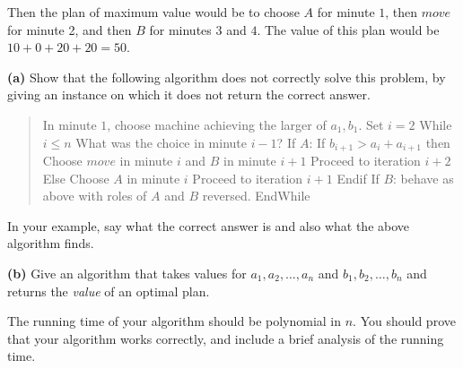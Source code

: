 \documentclass[12pt]{article}
\begin{document}
\begin{enumerate}
Then the plan of maximum value would be to choose
$A$ for minute $1$, then $move$ for minute 2,
and then $B$ for minutes $3$ and $4$.
The value of this plan would be $10 + 0 + 20 + 20 = 50$.

\bigskip
\bigskip

{\bf (a)} Show that the following algorithm does not
correctly solve this problem, by giving an instance on which
it does not return the correct answer.
\begin{quote}
\begin{code}
In minute $1$, choose machine achieving the larger of $a_1, b_1$.
Set $i=2$
While $i \le n$
   What was the choice in minute $i-1$?
   If $A$:
      If $b_{i+1} > a_i + a_{i+1}$ then
         Choose $move$ in minute $i$ and $B$ in minute $i+1$
         Proceed to iteration $i+2$
      Else
         Choose $A$ in minute $i$
         Proceed to iteration $i+1$
      Endif
   If $B$: behave as above with roles of $A$ and $B$ reversed.
EndWhile
\end{code}
\end{quote}
In your example, say what the correct answer is and
also what the above algorithm finds.


{\bf (b)}
Give an algorithm that takes values for
$a_1, a_2, \ldots, a_n$ and $b_1, b_2, \ldots, b_n$
and returns the {\em value} of an optimal plan.

The running time of your algorithm should be polynomial in $n$.
You should prove that your algorithm works correctly, and include a
brief analysis of the running time.

\end{enumerate}
\end{document}
